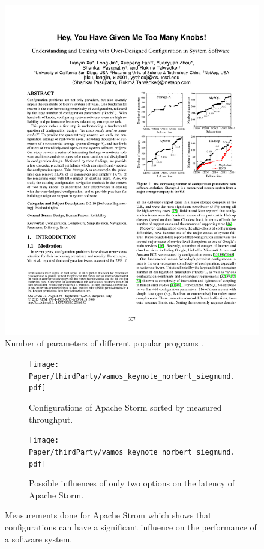 \begin{figure}[h!]
	\centering
	\includegraphics[clip,trim= 11cm 13cm 2cm 7cm]{Paper/thirdParty/HeyYouHaveGivenMeTooManyKnobs.pdf}
	\caption{Number of parameters of different popular programs \cite{YouveGivenMeTooManyKnobs}.}
	\label{fig:paramters}
\end{figure}
\begin{figure}[h]
	\begin{subfigure}{.45\linewidth}
		\centering
		\texttt{[image: Paper/thirdParty/vamos\_keynote\_norbert\_siegmund.pdf]}
		\caption{Configurations of Apache Storm sorted by measured throughput.}
		\label{fig:ApacheStorma}
	\end{subfigure}\hspace{.1\linewidth}
	\begin{subfigure}{.45\linewidth}
		\centering
		\texttt{[image: Paper/thirdParty/vamos\_keynote\_norbert\_siegmund.pdf]}
		\caption{Possible influences of only two options on the latency of Apache Storm. }
		\label{fig:ApacheStormb}
	\end{subfigure}
	\caption{Measurements done for Apache Strom which shows that configurations can have a significant influence on the performance of a software system.}
	\label{fig:ApacheStorm}
\end{figure}
 
